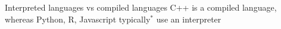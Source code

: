 \documentclass{beamer}
\begin{document}
\begin{frame}{Interpreted languages vs compiled languages}
    C++ is a compiled language, whereas Python, R, Javascript typically$^*$ use an interpreter
\begin{center}
\end{center}
\end{frame}
\end{document}
